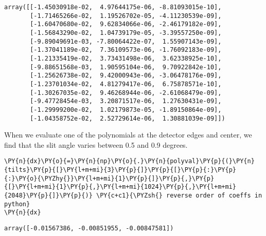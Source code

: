             \begin{tcolorbox}[breakable, size=fbox, boxrule=.5pt, pad at break*=1mm, opacityfill=0]
\begin{Verbatim}[commandchars=\\\{\}]
array([[-1.45030918e-02,  4.97644175e-06, -8.81093015e-10],
       [-1.71465266e-02,  1.19526702e-05, -4.11230539e-09],
       [-1.60470680e-02,  9.62834066e-06, -2.46179182e-09],
       [-1.56843290e-02,  1.04739179e-05, -3.39557250e-09],
       [-9.89049691e-03, -7.80064422e-07,  1.55907143e-09],
       [-1.37041189e-02,  7.36109573e-06, -1.76092183e-09],
       [-1.21335419e-02,  3.73431498e-06,  3.62338925e-10],
       [-9.88651568e-03,  1.90595104e-06,  9.70922842e-10],
       [-1.25626738e-02,  9.42000943e-06, -3.06478176e-09],
       [-1.23701034e-02,  4.81279417e-06,  6.75878571e-10],
       [-1.30267035e-02,  9.46268944e-06, -2.61068479e-09],
       [-9.47728454e-03,  3.20871517e-06,  1.27630431e-09],
       [-1.29999200e-02,  1.02179873e-05, -1.89150864e-09],
       [-1.04358752e-02,  2.52729614e-06,  1.30881039e-09]])
\end{Verbatim}
\end{tcolorbox}
        
    When we evaluate one of the polynomials at the detector edges and
center, we find that the slit angle varies between 0.5 and 0.9 degrees.

    \begin{tcolorbox}[breakable, size=fbox, boxrule=1pt, pad at break*=1mm,colback=cellbackground, colframe=cellborder]
\begin{Verbatim}[commandchars=\\\{\}]
\PY{n}{dx}\PY{o}{=}\PY{n}{np}\PY{o}{.}\PY{n}{polyval}\PY{p}{(}\PY{n}{tilts}\PY{p}{[}\PY{l+m+mi}{3}\PY{p}{]}\PY{p}{[}\PY{p}{:}\PY{p}{:}\PY{o}{\PYZhy{}}\PY{l+m+mi}{1}\PY{p}{]}\PY{p}{,}\PY{p}{[}\PY{l+m+mi}{1}\PY{p}{,}\PY{l+m+mi}{1024}\PY{p}{,}\PY{l+m+mi}{2048}\PY{p}{]}\PY{p}{)} \PY{c+c1}{\PYZsh{} reverse order of coeffs in python}
\PY{n}{dx}
\end{Verbatim}
\end{tcolorbox}

            \begin{tcolorbox}[breakable, size=fbox, boxrule=.5pt, pad at break*=1mm, opacityfill=0]
\begin{Verbatim}[commandchars=\\\{\}]
array([-0.01567386, -0.00851955, -0.00847581])
\end{Verbatim}
\end{tcolorbox}
        
